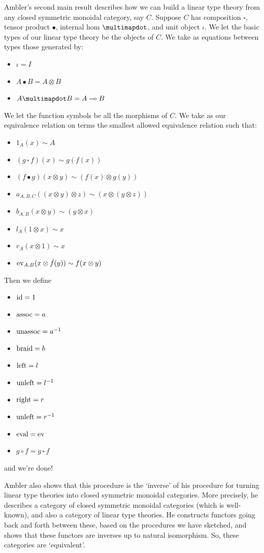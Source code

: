 \documentclass[12pt,twoside,openright]{report}
\newcommand{\lhom}{\multimap}
\newcommand{\tensor}{\otimes}
\newcommand{\Id}{{\rm id}}
\newcommand{\ev}{{\rm ev}}
\newcommand{\eval}{{\rm eval}}
\newcommand{\assoc}{{\rm assoc}}
\newcommand{\unassoc}{{\rm unassoc}}
\newcommand{\braid}{{\rm braid}}
\newcommand{\Left}{{\rm left}}
\newcommand{\Right}{{\rm right}}
\newcommand{\unleft}{{\rm unleft}}
\begin{document}
Ambler's second main result describes how we can build a linear type theory from any closed symmetric monoidal category, say $C$.  Suppose $C$ 
has composition $\square$, tensor product $\bullet$, internal hom
$\multimapdot$, and unit object $\iota$.  We let the basic types of our linear type theory be the objects of $C$.  We take as equations between types those generated by:
\begin{itemize}
  \item $\iota = I$
  \item $A \bullet B = A \tensor B$
  \item $A \multimapdot B = A \lhom B$
\end{itemize}
We let the function symbols be all the morphisms of $C$.  We take as our equivalence relation on terms the smallest allowed equivalence relation such that:
\begin{itemize}
  \item $1_A(x) \sim A$
  \item $(g \,\square\, f)(x) \sim g (f(x))$
  \item $(f \bullet g)(x \tensor y) \sim (f(x) \tensor g(y))$
  \item $a_{A,B,C}((x \tensor y) \tensor z) \sim (x \tensor (y \tensor z))$
  \item $b_{A, B}(x \tensor y) \sim (y \tensor x)$
  \item $l_A(1 \tensor x) \sim x$
  \item $r_A(x \tensor 1) \sim x$
  \item $\ev_{A, B}(x \tensor \tilde{f}(y)) \sim f(x \tensor y)$
\end{itemize}
Then we define
\begin{itemize}
  \item $\Id = 1$
  \item $\assoc = a$
  \item $\unassoc = a^{-1}$
  \item $\braid = b$
  \item $\Left = l$
  \item $\unleft = l^{-1}$
  \item $\Right = r$
  \item $\unleft = r^{-1}$
  \item $\eval = \ev$
  \item $g \circ f = g \,\square\, f$
\end{itemize}
and we're done!

Ambler also shows that this procedure is the `inverse' of his procedure for turning linear type theories into closed symmetric monoidal categories.  More precisely, he describes a category of closed symmetric monoidal categories (which is well-known), and also a category of linear type theories.  He constructs functors going back and forth between these, based on the procedures we have sketched, and shows that these functors are inverses up to natural isomorphism. So, these categories are `equivalent'.
\end{document}
